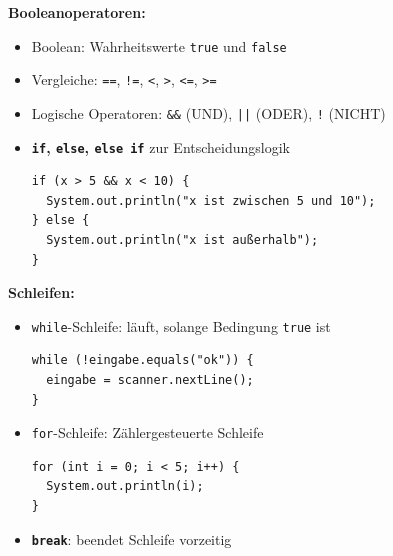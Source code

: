 \documentclass{../../sheet}
\begin{document}
\textbf{Booleanoperatoren:}
\begin{itemize}
		\item Boolean: Wahrheitswerte \texttt{true} und \texttt{false}
		\item Vergleiche: \texttt{==}, \texttt{!=}, \texttt{<}, \texttt{>}, \texttt{<=}, \texttt{>=}
		\item Logische Operatoren: \texttt{\&\&} (UND), \texttt{||} (ODER), \texttt{!} (NICHT)
		\item \textbf{\texttt{if}, \texttt{else}, \texttt{else if}} zur Entscheidungslogik
		      \begin{verbatim}
if (x > 5 && x < 10) {
  System.out.println("x ist zwischen 5 und 10");
} else {
  System.out.println("x ist außerhalb");
}
          \end{verbatim}
	\end{itemize}
    \bigskip
\textbf{Schleifen:}
\begin{itemize}
		\item \texttt{while}-Schleife: läuft, solange Bedingung \texttt{true} ist
		      \begin{verbatim}
while (!eingabe.equals("ok")) {
  eingabe = scanner.nextLine();
}
          \end{verbatim}
		\item \texttt{for}-Schleife: Zählergesteuerte Schleife
		      \begin{verbatim}
for (int i = 0; i < 5; i++) {
  System.out.println(i);
}
          \end{verbatim}
		\item \textbf{\texttt{break}}: beendet Schleife vorzeitig

	\end{itemize}
\newpage
{}
\end{document}
